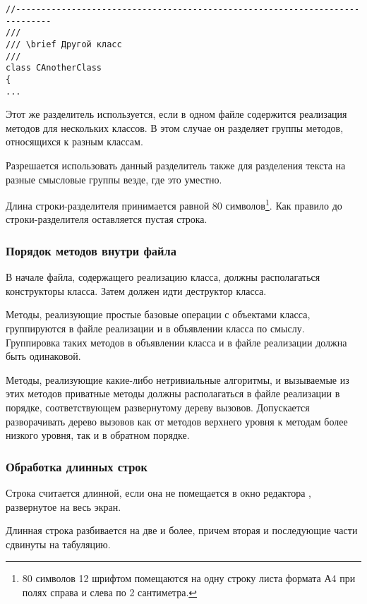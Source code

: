 {{{\begin{lstlisting}[frame=single,numbers=none]
//-----------------------------------------------------------------------------
///
/// \brief Другой класс
///
class CAnotherClass
{
...
\end{lstlisting}

Этот же разделитель используется, если в одном файле содержится реализация методов для нескольких классов. В этом случае он разделяет группы методов, относящихся к разным классам.

Разрешается использовать данный разделитель также для разделения текста на разные смысловые группы везде, где это уместно. 

Длина строки-разделителя принимается равной 80 символов\footnote[1]{80 символов 12 шрифтом помещаются на одну строку листа формата А4 при полях справа и слева по 2 сантиметра.}. Как правило до строки-разделителя оставляется пустая строка.

\subsubsection{Порядок методов внутри файла}

В начале файла, содержащего реализацию класса, должны располагаться конструкторы класса. Затем должен идти деструктор класса.

Методы, реализующие простые базовые операции с объектами класса, группируются в файле реализации и в объявлении класса по смыслу. Группировка таких методов в объявлении класса и в файле реализации должна быть одинаковой.

Методы, реализующие какие-либо нетривиальные алгоритмы, и вызываемые из этих методов приватные методы должны располагаться в файле реализации в порядке, соответствующем развернутому дереву вызовов. Допускается разворачивать дерево вызовов как от методов верхнего уровня к методам более низкого уровня, так и в обратном порядке.

\newpage
\subsubsection{Обработка длинных строк}

Строка считается длинной, если она не помещается в окно редактора , развернутое на весь экран. 

Длинная строка разбивается на две и более, причем вторая и последующие части сдвинуты на табуляцию.

}}}
